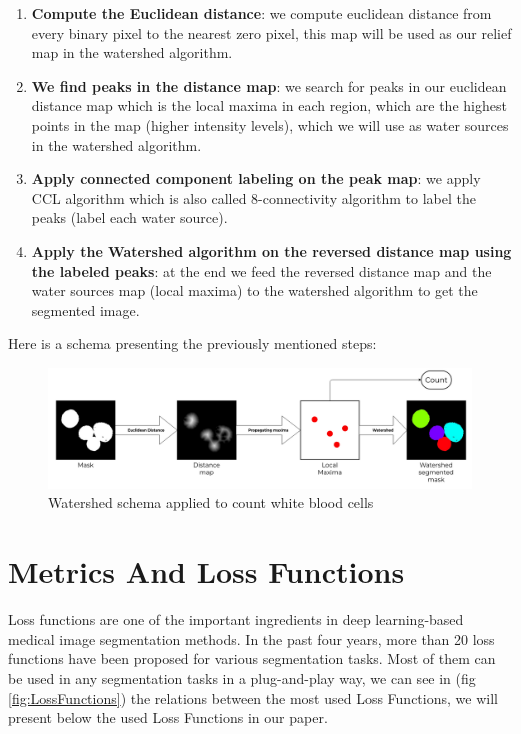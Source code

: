 \begin{enumerate}
    \item \textbf{Compute the Euclidean distance}: we compute euclidean distance from every binary pixel to the nearest zero pixel, this map will be used as our relief map in the watershed algorithm.
    \item \textbf{We find peaks in the distance map}: we search for peaks in our euclidean distance map which is the local maxima in each region, which are the highest points in the map (higher intensity levels), which we will use as water sources in the watershed algorithm.
    \item \textbf{Apply connected component labeling on the peak map}: we apply CCL algorithm which is also called 8-connectivity algorithm to label the peaks (label each water source).
    \item \textbf{Apply the Watershed algorithm on the reversed distance map using the labeled peaks}: at the end we feed the reversed distance map and the water sources map (local maxima) to the watershed algorithm to get the segmented image. 
\end{enumerate}

Here is a schema presenting the previously mentioned steps:

\begin{figure}[H]
\centering
  \vspace{-0.1in}
    \centerline{\includegraphics[width = 7in]{../images/watershed.png}}
    \caption{Watershed schema applied to count white blood cells}
\end{figure}

\section{Metrics And Loss Functions}
\hspace{\parindent}
Loss functions are one of the important ingredients in deep learning-based medical image segmentation methods. In the past four years, more than 20 loss functions have been proposed for various segmentation tasks. Most of them can be used in any segmentation tasks in a plug-and-play way, we can see in (fig \ref{fig:LossFunctions}) the relations between the most used  Loss Functions, we will present below the used Loss Functions in our paper.

